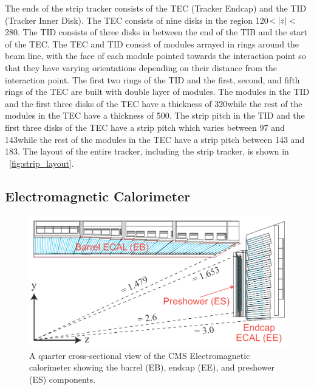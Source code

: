 The ends of the strip tracker consists of the TEC (Tracker Endcap) and the TID
(Tracker Inner Disk). The TEC consists of nine disks in the region
120\centimeters $< |z| <$ 280\centimeters. The TID consists of three
disks in between the end of the TIB and the start of the TEC. The TEC and TID
consist of modules arrayed in rings around the beam line, with the face of each
module pointed towards the interaction point so that they have varying
orientations depending on their distance from the interaction point. The first
two rings of the TID and the first, second, and fifth rings of the TEC are
built with double layer of modules. The modules in the TID and the first three
disks of the TEC have a thickness of 320\micrometers while the rest of the
modules in the TEC have a thickness of 500\micrometers. The strip pitch in the
TID and the first three disks of the TEC have a strip pitch which varies
between 97 and 143\micrometers while the rest of the modules in the TEC have a
strip pitch between 143 and 183\micrometers. The layout of the entire tracker,
including the strip tracker, is shown in \FIG~\ref{fig:strip_layout}.

\subsection{Electromagnetic Calorimeter}
\label{ssec:ecal}

\begin{figure}[!htbp]
    \centering
    \includegraphics[width=\textwidth]{figures/ecal_layout.png}
    \caption[
        A quarter cross-sectional view of the CMS Electromagnetic calorimeter.
    ]{
        A quarter cross-sectional view of the CMS Electromagnetic calorimeter
        showing the barrel (EB), endcap (EE), and preshower (ES) components.
    }
    \label{fig:ecal_layout}
\end{figure}

